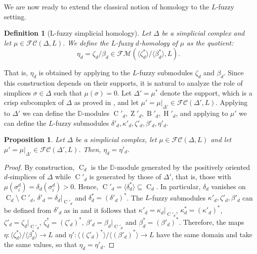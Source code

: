 \documentclass[a4paper,10pt]{article}
\newtheorem{definition}[theorem]{Definition}
\newtheorem{proposition}[theorem]{Proposition}
\newcommand{\bbd}{\mathbb{D}}
\newcommand{\calfm}{\mathcal{F\!M}}
\newcommand{\calfc}{\mathcal{FC}}
\DeclareMathOperator{\Co}{C}
\DeclareMathOperator{\Zo}{Z}
\DeclareMathOperator{\Bo}{B}
\DeclareMathOperator{\Ho}{H}
\begin{document}
We are now ready to extend the classical notion of homology to the \(L\)-fuzzy setting.
\begin{definition}[L-fuzzy simplicial homology]
\label{def:eta}
Let $\Delta$ be a simplicial complex and let $\mu \in \calfc(\Delta,L)$.  
We define the \emph{\(L\)-fuzzy \(d\)-homology of \(\mu\)} as the quotient:
\[
\eta_d = \zeta_d/\beta_d
\in \calfm(\langle\zeta_d^*\rangle/\langle\beta^*_d\rangle,L).
\]
\end{definition}

That is, \(\eta_d\) is obtained by applying  to the \(L\)-fuzzy submodules \(\zeta_d\) and \(\beta_d\). Since this construction depends on their supports, it is natural to analyze the role of simplices \(\sigma \in \Delta\) such that \(\mu(\sigma)=0\). Let \(\Delta'=\mu^*\) denote the support, which is a crisp subcomplex of \(\Delta\) as proved in , and let \(\mu' = \mu|_{\Delta'} \in \calfc(\Delta',L)\). Applying  to \(\Delta'\) we can define the \(\bbd\)-modules \(\Co'_d, \Zo'_d, \Bo'_d, \Ho'_d\), and applying  to \(\mu'\) we can define the \(L\)-fuzzy submodules \(\delta'_d, \kappa'_d, \zeta'_d, \beta'_d, \eta'_d\).

\begin{proposition}
\label{prop:supportcomplex}
Let \(\Delta\) be a simplicial complex, let \(\mu \in \calfc(\Delta,L)\) and let \(\mu' = \mu|_{\Delta'} \in \calfc(\Delta',L)\). 
Then, \(\eta_d=\eta'_d\).
\end{proposition}

\begin{proof}
By construction, \(\Co_d\) is the \(\bbd\)-module generated by the positively oriented \(d\)-simplices of \(\Delta\) while \(\Co'_d\) is generated by those of \(\Delta'\), that is, those with \(\mu(\sigma^d_i)=\delta_d(\sigma^d_i)>0\). Hence, \(\Co'_d= \langle \delta_d^* \rangle \subseteq \Co_d\). 
In particular, \(\delta_d\) vanishes on \(\Co_d \setminus \Co'_d\), \(\delta'_d = \delta_d|_{\Co'_d}\) and \(\delta_d^* = (\delta'_d)^*\). The \(L\)-fuzzy submodules \(\kappa'_d,\zeta'_d,\beta'_d\) can be defined from \(\delta'_d\) as in  and it follows that 
\(\kappa'_d = \kappa_d|_{\Co'_d}\), \(\kappa_d^* = (\kappa'_d)^*\),
\(\zeta'_d = \zeta_d|_{\Co'_d}\), \(\zeta_d^* = (\zeta'_d)^*\),
\(\beta'_d = \beta_d|_{\Co'_d}\) and \(\beta_d^* = (\beta'_d)^*\).
Therefore, the maps \(\eta: \langle \zeta_d^* \rangle / \langle \beta_d^* \rangle \to L\) and \(\eta': \langle (\zeta'_d)^* \rangle / \langle (\beta'_d)^* \rangle \to L\) have the same domain and take the same values, so that \(\eta_d=\eta'_d\).
\end{proof}
\end{document}
